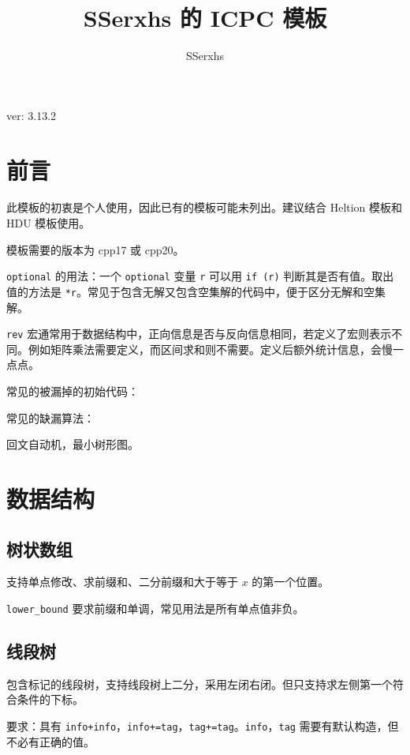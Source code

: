 \documentclass[12pt]{ctexart}
\author{SSerxhs}
\title{SSerxhs 的 ICPC 模板}
\begin{document}
\maketitle

\centerline{ver: 3.13.2}

\tableofcontents

\newpage

\section{前言}

此模板的初衷是个人使用，因此已有的模板可能未列出。建议结合 Heltion 模板和 HDU 模板使用。

模板需要的版本为 cpp17 或 cpp20。

\verb|optional| 的用法：一个 \verb|optional| 变量 \verb|r| 可以用 \verb|if (r)| 判断其是否有值。取出值的方法是 \verb|*r|。常见于包含无解又包含空集解的代码中，便于区分无解和空集解。

\verb|rev| 宏通常用于数据结构中，正向信息是否与反向信息相同，若定义了宏则表示不同。例如矩阵乘法需要定义，而区间求和则不需要。定义后额外统计信息，会慢一点点。

常见的被漏掉的初始代码：


常见的缺漏算法：

回文自动机，最小树形图。

\newpage

\section{数据结构}

\subsection{树状数组}

支持单点修改、求前缀和、二分前缀和大于等于 $x$ 的第一个位置。

\verb|lower_bound| 要求前缀和单调，常见用法是所有单点值非负。


\subsection{线段树}

包含标记的线段树，支持线段树上二分，采用左闭右闭。但只支持求左侧第一个符合条件的下标。

要求：具有 \verb|info+info|，\verb|info+=tag|，\verb|tag+=tag|。\verb|info|，\verb|tag| 需要有默认构造，但不必有正确的值。
\end{document}
